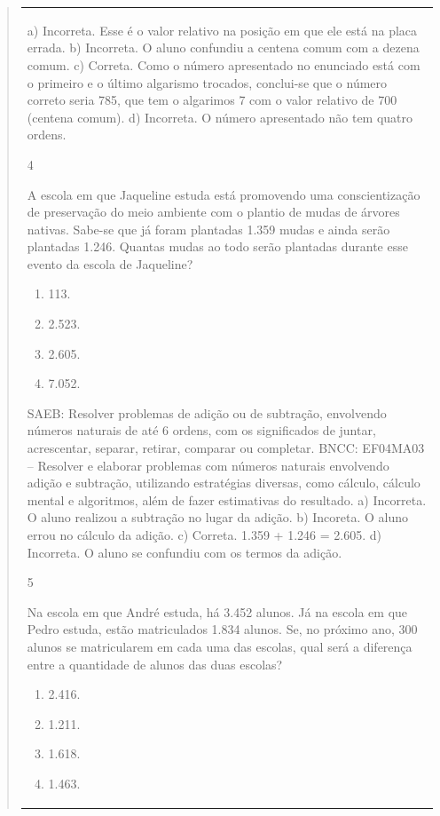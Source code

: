 \begin{mdframed}[linewidth=2pt,linecolor=salmao,roundcorner=2pt]
\begin{itemize}
{\begin{itemize}
\begin{escolha}
{\begin{quote}
{\begin{escolha}
{{{{{\begin{longtable}[]{@{}l@{}}
\begin{itemize}
{a) Incorreta. Esse é o valor relativo na posição em que ele está na placa errada.
b) Incorreta. O aluno confundiu a centena comum com a dezena comum.
c) Correta. Como o número apresentado no enunciado está com o primeiro e o último
algarismo trocados, conclui-se que o número correto seria 785, que tem o algarimos 7 com o valor relativo de 700 (centena comum).
d) Incorreta. O número apresentado não tem quatro ordens.

\num{4}

A escola em que Jaqueline estuda está promovendo uma conscientização de
preservação do meio ambiente com o plantio de mudas de árvores
nativas. Sabe-se que já foram plantadas 1.359 mudas e ainda serão
plantadas 1.246. Quantas mudas ao todo serão plantadas durante esse
evento da escola de Jaqueline?

\begin{enumerate}
\item
  113.
\item
  2.523.
\item
  2.605.
\item
  7.052.
\end{enumerate}

SAEB: Resolver problemas de adição ou de subtração, envolvendo números
naturais de até 6 ordens, com os significados de juntar, acrescentar,
separar, retirar, comparar ou completar.
BNCC: EF04MA03 -- Resolver e elaborar problemas com números naturais envolvendo adição e subtração,
utilizando estratégias diversas, como cálculo, cálculo mental e algoritmos, além de fazer estimativas
do resultado.
a) Incorreta. O aluno realizou a subtração no lugar da adição.
b) Incoreta. O aluno errou no cálculo da adição.
c) Correta. 1.359 + 1.246 = 2.605.
d) Incorreta. O aluno se confundiu com os termos da adição.

\num{5}

Na escola em que André estuda, há 3.452 alunos. Já na escola em que
Pedro estuda, estão matriculados 1.834 alunos. Se, no próximo ano, 300
alunos se matricularem em cada uma das escolas, qual será a diferença
entre a quantidade de alunos das duas escolas?

\begin{enumerate}
\item
  2.416.
\item
  1.211.
\item
  1.618.
\item
  1.463.
\end{enumerate}

}
\end{itemize}
\end{longtable}}}}}}
\end{escolha}}
\end{quote}}
\end{escolha}
\end{itemize}}
\end{itemize}
\end{mdframed}
